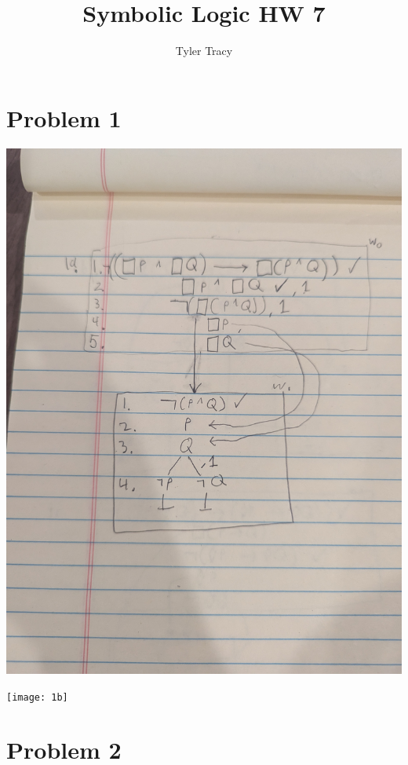\documentclass[12pt]{article}
\title{Symbolic Logic HW 7}
\author{Tyler Tracy}
\begin{document}
\maketitle

\section*{Problem 1}

\includegraphics[width=\textwidth]{1a}

\break

\texttt{[image: 1b]}

\section*{Problem 2}
\end{document}
